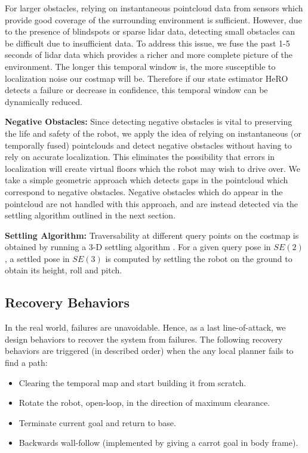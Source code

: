 \documentclass[letterpaper, 10 pt, conference]{ieeeconf}  %
\newcommand{\pr}[1]{\textbf{#1:}}  %
\begin{document}
For larger obstacles, relying on instantaneous pointcloud data from sensors which provide good coverage of the surrounding environment is sufficient.  However, due to the presence of blindspots or sparse lidar data, detecting small obstacles can be difficult due to insufficient data.  To address this issue, we fuse the past 1-5 seconds of lidar data which provides a richer and more complete picture of the environment.  The longer this temporal window is, the more susceptible to localization noise our costmap will be.  Therefore if our state estimator HeRO detects a failure or decrease in confidence, this temporal window can be dynamically reduced.

\pr{Negative Obstacles}
Since detecting negative obstacles is vital to preserving the life and safety of the robot, we apply the idea of relying on instantaneous (or temporally fused) pointclouds and detect negative obstacles without having to rely on accurate localization.  This eliminates the possibility that errors in localization will create virtual floors which the robot may wish to drive over.  We take a simple geometric approach which detects gaps in the pointcloud which correspond to negative obstacles.  Negative obstacles which do appear in the pointcloud are not handled with this approach, and are instead detected via the settling algorithm outlined in the next section.

\pr{Settling Algorithm}
Traversability at different query points on the costmap is obtained by running a 3-D settling algorithm \cite{krusi2017driving}.
For a given query pose in $SE(2)$, a settled pose in $SE(3)$ is computed by settling the robot on the ground to obtain its height, roll and pitch.


\subsection{Recovery Behaviors}
In the real world, failures are unavoidable. 
Hence, as a last line-of-attack, we design behaviors to recover the system from failures.
The following recovery behaviors are triggered (in described order) when the any local planner fails to find a path:
\begin{itemize}
    \item Clearing the temporal map and start building it from scratch. 
    \item Rotate the robot, open-loop, in the direction of maximum clearance.
    \item Terminate current goal and return to base.
    \item Backwards wall-follow (implemented by giving a carrot goal in body frame).
\end{itemize}
\end{document}
